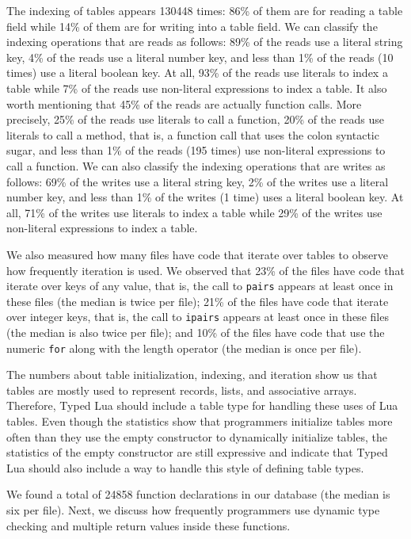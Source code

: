 \documentclass[preprint]{sig-alternate}
\begin{document}
The indexing of tables appears 130448 times:
86\% of them are for reading a table field while
14\% of them are for writing into a table field.
We can classify the indexing operations that are reads as follows:
89\% of the reads use a literal string key,
4\% of the reads use a literal number key,
and less than 1\% of the reads (10 times) use a literal boolean key.
At all, 93\% of the reads use literals to index a table while
7\% of the reads use non-literal expressions to index a table.
It also worth mentioning that 45\% of the reads are actually
function calls.
More precisely, 25\% of the reads use literals to call a function,
20\% of the reads use literals to call a method, that is,
a function call that uses the colon syntactic sugar, 
and less than 1\% of the reads (195 times) use non-literal expressions
to call a function.
We can also classify the indexing operations that are writes as follows: 
69\% of the writes use a literal string key,
2\% of the writes use a literal number key,
and less than 1\% of the writes (1 time) uses a literal boolean key.
At all, 71\% of the writes use literals to index a table while
29\% of the writes use non-literal expressions to index a table.

We also measured how many files have code that iterate over tables to
observe how frequently iteration is used.
We observed that 23\% of the files have code that iterate over keys
of any value, that is, the call to \texttt{pairs} appears at least
once in these files (the median is twice per file);
21\% of the files have code that iterate over integer keys, that is,
the call to \texttt{ipairs} appears at least once in these files
(the median is also twice per file);
and 10\% of the files have code that use the numeric \texttt{for}
along with the length operator (the median is once per file).

The numbers about table initialization, indexing, and iteration
show us that tables are mostly used to represent records, lists,
and associative arrays.
Therefore, Typed Lua should include a table type for handling
these uses of Lua tables.
Even though the statistics show that programmers initialize tables
more often than they use the empty constructor to
dynamically initialize tables, the statistics of the empty
constructor are still expressive and indicate that Typed Lua should
also include a way to handle this style of defining table types.

We found a total of 24858 function declarations in our database
(the median is six per file).
Next, we discuss how frequently programmers use dynamic type
checking and multiple return values inside these functions.
\end{document}
